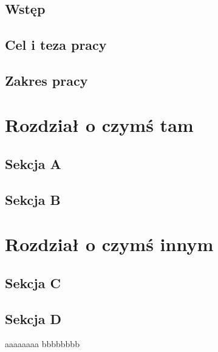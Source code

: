 \documentclass[a4paper,12pt]{book} %
\begin{document}
\sloppy



\thispagestyle{empty}



\newpage{}

\thispagestyle{empty}

\newpage{}



\tableofcontents{}

\chapter{}
\section{Wstęp}
\lipsum[1]

\section{Cel i teza pracy}
\lipsum[1]

\section{Zakres pracy}
\lipsum[1]

\chapter{Rozdział o czymś tam}

\section{Sekcja A}


\section{Sekcja B}


\chapter{Rozdział o czymś innym}

\section{Sekcja C}


\section{Sekcja D}


\listoftables{} %

\listoffigures{} %

\begin{thebibliography}{99}
 \bibitem aaaaaaaa
 \bibitem bbbbbbbb 
\end{thebibliography}
\end{document}
